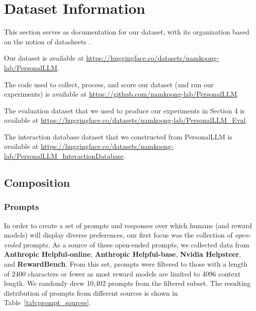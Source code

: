 
    

\section{Dataset Information}\label{app:add_data_det}

This section serves as documentation for our dataset, with its organization based on the notion of datasheets \citep{gebru2021datasheets}.

Our dataset is available at \url{https://huggingface.co/datasets/namkoong-lab/PersonalLLM}.

The code used to collect, process, and score our dataset (and run our experiments) is available at \url{https://github.com/namkoong-lab/PersonalLLM}.

The evaluation dataset that we used to produce our experiments in Section 4 is available at \url{https://huggingface.co/datasets/namkoong-lab/PersonalLLM_Eval}.

The interaction database dataset that we constructed from PersonalLLM is available at \url{https://huggingface.co/datasets/namkoong-lab/PersonalLLM_InteractionDatabase}.

\subsection{Composition}

\subsubsection{Prompts}

In order to create a set of prompts and responses over which humans (and reward models) will display diverse preferences, our first focus was the collection of \textit{open-ended} prompts.
As a source of these open-ended prompts, we collected data from \textbf{Anthropic Helpful-online}, \textbf{Anthropic Helpful-base}, \textbf{Nvidia Helpsteer}, and \textbf{RewardBench}.
From this set, prompts were filtered to those with a length of 2400 characters or fewer as most reward models are limited to 4096 context length. We randomly drew 10,402 prompts from the filtered subset.  The resulting distribution of prompts from different sources is shown in Table~\ref{tab:prompt_sources}.

